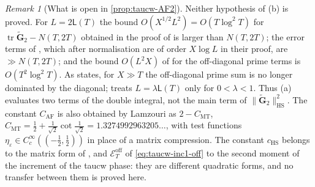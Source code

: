 \documentclass[11pt,a4paper]{article}
\numberwithin{equation}{section}
\theoremstyle{definition}
\theoremstyle{remark}
\newtheorem{remark}[theorem]{Remark}
\begin{document}
\begin{remark}[What is open in \cref{prop:taucw-AF2}]\label{rem:taucw-AF2}
Neither hypothesis of (b) is proved. For $L=2\mathsf L(T)$ the bound $O(X^{1/2}L^2)=O(T\log^2T)$ for $\operatorname{tr}\widetilde{\mathbf G}_2-N(T,2T)$ obtained in the proof of \cite[Prop.~4.2]{AlpogeFurman2026} is larger than $N(T,2T)$; the error terms of \cite[Prop.~5.2]{AlpogeFurman2026}, which after normalisation are of order $X\log L$ in their proof, are $\gg N(T,2T)$; and the bound $O(L^2X)$ of \cite[Prop.~5.4]{AlpogeFurman2026} for the off-diagonal prime terms is $O(T^2\log^2T)$. As \cite[\S7.2(a)]{AlpogeFurman2026} states, for $X\gg T$ the off-diagonal prime sum is no longer dominated by the diagonal; \cite[Remark~6.1]{AlpogeFurman2026} treats $L=\lambda\mathsf L(T)$ only for $0<\lambda<1$. Thus (a) evaluates two terms of the double integral, not the main term of $\|\widetilde{\mathbf G}_2\|_{\mathrm{HS}}^2$. The constant $C_{\mathrm{AF}}$ is also obtained by Lamzouri \cite[Thm.~1.1, (1.1), (3.1), Lemma~3.2]{Lamzouri2026} as $2-C_{\mathrm{MT}}$, $C_{\mathrm{MT}}=\frac12+\frac1{\sqrt2}\cot\frac1{\sqrt2}=1.3274992963205\ldots$, with test functions $\eta_\varepsilon\in C_c^\infty((-\frac12,\frac12))$ in place of a matrix compression. The constant $c_{\mathrm{HS}}$ belongs to the matrix form of \cite{AlpogeFurman2026}, and $\mathscr E^{\mathrm{off}}_T$ of \eqref{eq:taucw-inc1-off} to the second moment of the increment of the taucw phase: they are different quadratic forms, and no transfer between them is proved here.
\end{remark}
\end{document}
